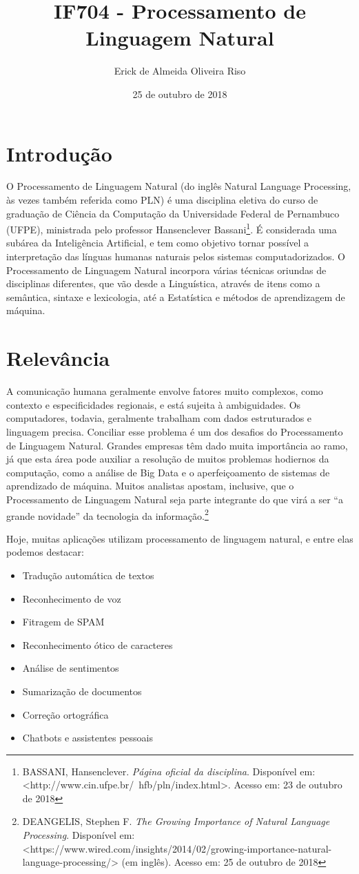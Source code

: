 \documentclass[a4paper]{article}
\title{IF704 - Processamento de Linguagem Natural}
\author{Erick de Almeida Oliveira Riso}
\date{25 de outubro de 2018}
\begin{document}
\maketitle

\section{Introdução}

O Processamento de Linguagem Natural (do inglês Natural Language Processing, às vezes também referida como PLN) é uma disciplina eletiva do curso de graduação de Ciência da Computação da Universidade Federal de Pernambuco (UFPE), ministrada pelo professor Hansenclever Bassani\footnote{BASSANI, Hansenclever. \textit{Página oficial da disciplina}. Disponível em: <http://www.cin.ufpe.br/~hfb/pln/index.html>. Acesso em: 23 de outubro de 2018}. É considerada uma subárea da Inteligência Artificial, e tem como objetivo tornar possível a interpretação das línguas humanas naturais pelos sistemas computadorizados. O Processamento de Linguagem Natural incorpora várias técnicas oriundas de disciplinas diferentes, que vão desde a Linguística, através de itens como a semântica, sintaxe e lexicologia, até a Estatística e métodos de aprendizagem de máquina.

\section{Relevância}

A comunicação humana geralmente envolve fatores muito complexos, como contexto e especificidades regionais, e está sujeita à ambiguidades. Os computadores, todavia, geralmente trabalham com dados estruturados e linguagem precisa. Conciliar esse problema é um dos desafios do Processamento de Linguagem Natural.
Grandes empresas têm dado muita importância ao ramo, já que esta área pode auxiliar a resolução de muitos problemas hodiernos da computação, como a análise de Big Data e o aperfeiçoamento de sistemas de aprendizado de máquina. Muitos analistas apostam, inclusive, que o Processamento de Linguagem Natural seja parte integrante do que virá a ser ``a grande novidade'' da tecnologia da informação.\footnote{DEANGELIS, Stephen F. \textit{The Growing Importance of Natural Language Processing}. Disponível em: <https://www.wired.com/insights/2014/02/growing-importance-natural-language-processing/> (em inglês). Acesso em: 25 de outubro de 2018}

Hoje, muitas aplicações utilizam processamento de linguagem natural, e entre elas podemos destacar:
\begin{itemize}
\item Tradução automática de textos
\item Reconhecimento de voz
\item Fitragem de SPAM
\item Reconhecimento ótico de caracteres
\item Análise de sentimentos
\item Sumarização de documentos
\item Correção ortográfica
\item Chatbots e assistentes pessoais
\end{itemize}
\pagebreak
\end{document}
